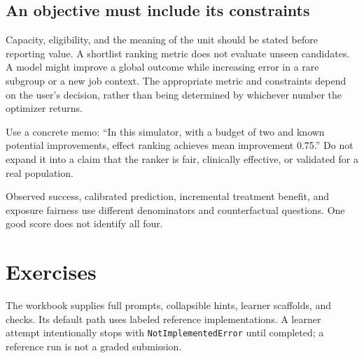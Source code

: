 \documentclass[11pt,oneside]{scrbook}
\begin{document}
\section{An objective must include its constraints}
Capacity, eligibility, and the meaning of the unit should be stated before reporting
value. A shortlist ranking metric does not evaluate unseen candidates. A model might
improve a global outcome while increasing error in a rare subgroup or a new job context.
The appropriate metric and constraints depend on the user's decision, rather than being
determined by whichever number the optimizer returns.

Use a concrete memo: ``In this simulator, with a budget of two and known potential
improvements, effect ranking achieves mean improvement 0.75.'' Do not expand it into
a claim that the ranker is fair, clinically effective, or validated for a real population.
\begin{pitfall}
Observed success, calibrated prediction, incremental treatment benefit, and exposure
fairness use different denominators and counterfactual questions. One good score does
not identify all four.
\end{pitfall}

\chapter{Exercises}
The workbook supplies full prompts, collapsible hints, learner scaffolds, and checks.
Its default path uses labeled reference implementations. A learner attempt intentionally
stops with \texttt{NotImplementedError} until completed; a reference run is not a graded submission.
\end{document}
